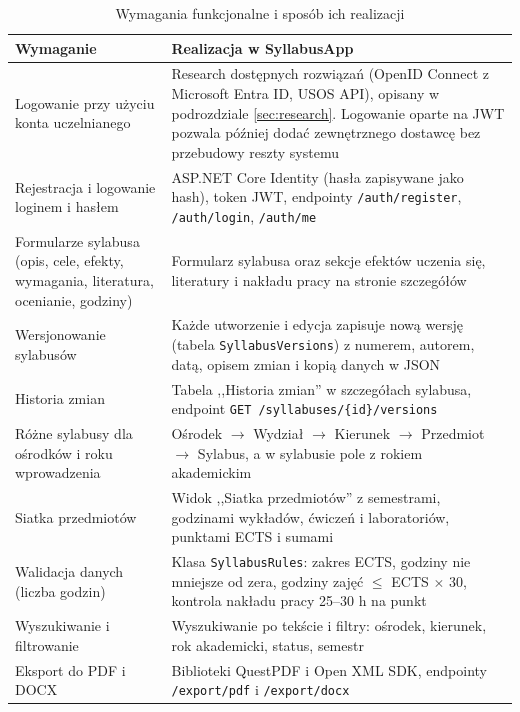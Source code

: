 \documentclass[times]{san}
\begin{document}
\begin{table}[H]
\centering
\caption{Wymagania funkcjonalne i sposób ich realizacji}
\label{tab:wymagania}
\small
\begin{tabularx}{\textwidth}{|p{4.6cm}|X|}
\hline
\textbf{Wymaganie} & \textbf{Realizacja w SyllabusApp} \\
\hline
Logowanie przy użyciu konta uczelnianego & Research dostępnych rozwiązań (OpenID Connect z Microsoft Entra ID, USOS API), opisany w podrozdziale \ref{sec:research}. Logowanie oparte na JWT pozwala później dodać zewnętrznego dostawcę bez przebudowy reszty systemu \\
\hline
Rejestracja i logowanie loginem i hasłem & ASP.NET Core Identity (hasła zapisywane jako hash), token JWT, endpointy \texttt{/auth/register}, \texttt{/auth/login}, \texttt{/auth/me} \\
\hline
Formularze sylabusa (opis, cele, efekty, wymagania, literatura, ocenianie, godziny) & Formularz sylabusa oraz sekcje efektów uczenia się, literatury i nakładu pracy na stronie szczegółów \\
\hline
Wersjonowanie sylabusów & Każde utworzenie i edycja zapisuje nową wersję (tabela \texttt{SyllabusVersions}) z numerem, autorem, datą, opisem zmian i kopią danych w JSON \\
\hline
Historia zmian & Tabela ,,Historia zmian'' w szczegółach sylabusa, endpoint \texttt{GET /syllabuses/\{id\}/versions} \\
\hline
Różne sylabusy dla ośrodków i roku wprowadzenia & Ośrodek $\rightarrow$ Wydział $\rightarrow$ Kierunek $\rightarrow$ Przedmiot $\rightarrow$ Sylabus, a w sylabusie pole z rokiem akademickim \\
\hline
Siatka przedmiotów & Widok ,,Siatka przedmiotów'' z semestrami, godzinami wykładów, ćwiczeń i laboratoriów, punktami ECTS i sumami \\
\hline
Walidacja danych (liczba godzin) & Klasa \texttt{SyllabusRules}: zakres ECTS, godziny nie mniejsze od zera, godziny zajęć $\le$ ECTS $\times$ 30, kontrola nakładu pracy 25--30 h na punkt \\
\hline
Wyszukiwanie i filtrowanie & Wyszukiwanie po tekście i filtry: ośrodek, kierunek, rok akademicki, status, semestr \\
\hline
Eksport do PDF i DOCX & Biblioteki QuestPDF i Open XML SDK, endpointy \texttt{/export/pdf} i \texttt{/export/docx} \\
\hline
\end{tabularx}
\end{table}
\end{document}
